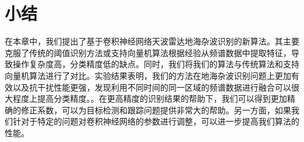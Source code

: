 
\section{小结}
在本章中，我们提出了基于卷积神经网络天波雷达地海杂波识别的新算法。其主要克服了传统的阈值识别方法或支持向量机算法根据经验从频谱数据中提取特征，导致操作复杂度高，分类精度低的缺点。同时，我们将我们的算法与传统算法和支持向量机算法进行了对比。实验结果表明，我们的方法在地海杂波识别问题上更加有效以及抗干扰性能更强，发现利用不同时间的同一区域的频谱数据进行融合可以很大程度上提高分类精度。。在更高精度的识别结果的帮助下，我们可以得到更加精确的修正系数，可以为目标检测和跟踪问题提供非常大的帮助。另一方面，如果我们针对于特定的问题对卷积神经网络的参数进行调整，可以进一步提高我们算法的性能。



